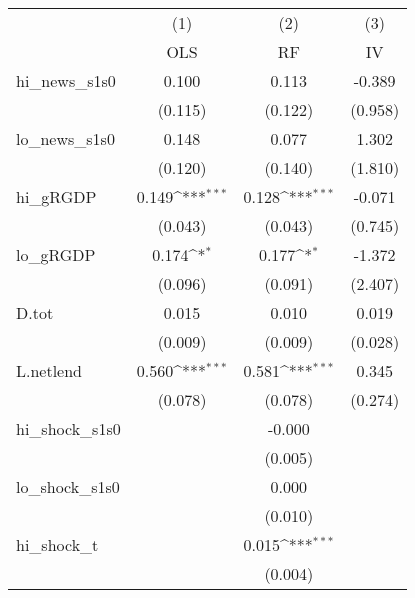 {
\def\sym#1{\ifmmode^{#1}\else\(^{#1}\)\fi}
\begin{tabular}{l*{3}{c}}
\toprule
            &\multicolumn{1}{c}{(1)}&\multicolumn{1}{c}{(2)}&\multicolumn{1}{c}{(3)}\\
            &\multicolumn{1}{c}{OLS}&\multicolumn{1}{c}{RF}&\multicolumn{1}{c}{IV}\\
\midrule
hi\_news\_s1s0&       0.100         &       0.113         &      -0.389         \\
            &     (0.115)         &     (0.122)         &     (0.958)         \\
\addlinespace
lo\_news\_s1s0&       0.148         &       0.077         &       1.302         \\
            &     (0.120)         &     (0.140)         &     (1.810)         \\
\addlinespace
hi\_gRGDP    &       0.149\sym{***}&       0.128\sym{***}&      -0.071         \\
            &     (0.043)         &     (0.043)         &     (0.745)         \\
\addlinespace
lo\_gRGDP    &       0.174\sym{*}  &       0.177\sym{*}  &      -1.372         \\
            &     (0.096)         &     (0.091)         &     (2.407)         \\
\addlinespace
D.tot       &       0.015         &       0.010         &       0.019         \\
            &     (0.009)         &     (0.009)         &     (0.028)         \\
\addlinespace
L.netlend   &       0.560\sym{***}&       0.581\sym{***}&       0.345         \\
            &     (0.078)         &     (0.078)         &     (0.274)         \\
\addlinespace
hi\_shock\_s1s0&                     &      -0.000         &                     \\
            &                     &     (0.005)         &                     \\
\addlinespace
lo\_shock\_s1s0&                     &       0.000         &                     \\
            &                     &     (0.010)         &                     \\
\addlinespace
hi\_shock\_t  &                     &       0.015\sym{***}&                     \\
            &                     &     (0.004)         &                     \\

\end{tabular}}
